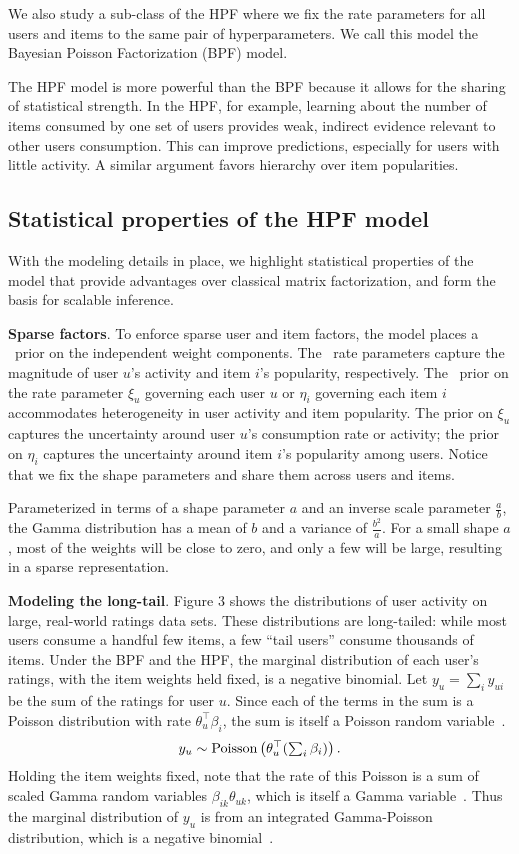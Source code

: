 We also study a sub-class of the HPF where we fix the rate parameters
for all users and items to the same pair of hyperparameters. We call
this model the Bayesian Poisson Factorization (BPF) model.

The HPF model is more powerful than the BPF because it allows for the
sharing of statistical strength. In the HPF, for example, learning
about the number of items consumed by one set of users provides weak,
indirect evidence relevant to other users consumption. This can
improve predictions, especially for users with little activity. A
similar argument favors hierarchy over item popularities.


\subsection{Statistical properties of the HPF model}
With the modeling details in place, we highlight statistical
properties of the model that provide advantages over classical matrix
factorization, and form the basis for scalable inference.

{\bf Sparse factors}.
To enforce sparse user and item factors, the model places a \gam~prior
on the independent weight components. The \gam~rate parameters capture
the magnitude of user $u$'s activity and item $i$'s popularity,
respectively. The \gam~prior on the rate parameter $\xi_u$ governing
each user $u$ or $\eta_i$ governing each item $i$ accommodates
heterogeneity in user activity and item popularity. The prior on
$\xi_u$ captures the uncertainty around user $u$'s consumption rate or
activity; the prior on $\eta_i$ captures the uncertainty around item
$i$'s popularity among users. Notice that we fix the shape parameters
and share them across users and items.

Parameterized in terms of a shape parameter $a$ and an inverse scale
parameter $\frac{a}{b}$, the Gamma distribution has a mean of $b$ and
a variance of $\frac{b^2}{a}$. For a small shape $a$, most of the
weights will be close to zero, and only a few will be large, resulting
in a sparse representation.


{\bf Modeling the long-tail}.
Figure 3 shows the distributions of user activity on large, real-world
ratings data sets. These distributions are long-tailed: while most
users consume a handful few items, a few ``tail users'' consume
thousands of items. Under the BPF and the HPF, the marginal
distribution of each user's ratings, with the item weights held fixed,
is a negative binomial.  Let $y_{u} = \sum_{i} y_{ui}$ be the sum of
the ratings for user $u$.  Since each of the terms in the sum is a
Poisson distribution with rate $\theta_u^\top \beta_i$, the sum is
itself a Poisson random variable~\cite{Johnson:2005}.
\begin{equation}
  y_u \sim \textrm{Poisson}\left(\theta_u^\top (\textstyle \sum_{i} \beta_{i})\right).
\end{equation}
Holding the item weights fixed, note that the rate of this Poisson is
a sum of scaled Gamma random variables $\beta_{ik} \theta_{uk}$, which
is itself a Gamma variable~\cite{Norman:1994}.  Thus the marginal
distribution of $y_u$ is from an integrated Gamma-Poisson
distribution, which is a negative binomial~\cite{Gelman:1995}.

